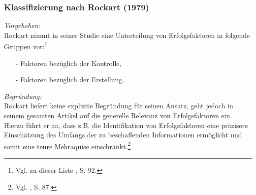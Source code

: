 \noindent
\subsubsection{Klassifizierung nach Rockart (1979)}
\textit{Vorgehehen:}\\\noindent
Rockart nimmt in seiner Studie eine Unterteilung von Erfolgsfaktoren in folgende Gruppen vor:\footnote{Vgl. zu dieser Liste \cite{Rockart.1979}, S. 92.}
\begin{itemize}\itemsep0pt
\item[-]Faktoren bezüglich der Kontrolle,
\item[-]Faktoren bezüglich der Erstellung.
\end{itemize}
\textit{Begründung:}\\\noindent
Rockart liefert keine explizite Begründung für seinen Ansatz, geht jedoch in seinem gesamten Artikel auf die
generelle Relevanz von Erfolgsfaktoren ein. 
Hierzu führt er an, dass z.B. die Identifikation von Erfolgsfaktoren eine präzisere Einschätzung
des Umfangs der zu beschaffenden Informationen ermöglicht und somit eine teure Mehraquise einschränkt.\footnote{Vgl. \cite{Rockart.1979}, S. 87.}
